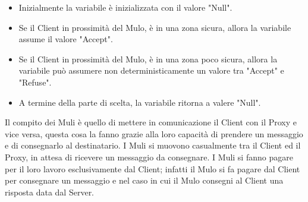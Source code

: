 \documentclass[13pt,a4paper]{article}
\begin{document}
\begin{itemize}
\begin{itemize}
	\begin{itemize}
		\item Inizialmente la variabile è inizializzata con il valore "Null".
		\item Se il Client in prossimità del Mulo,  è in una zona sicura, allora la variabile assume il valore "Accept". 
		\item Se il Client in prossimità del Mulo, è in una zona poco sicura, allora la variabile può assumere non deterministicamente un valore tra "Accept" e "Refuse".
		\item A termine della parte di scelta, la variabile ritorna a valere "Null".
	\end{itemize}
	\end{itemize}
	Il compito dei Muli è  quello di mettere in comunicazione il Client con il Proxy e vice versa, questa cosa la fanno grazie alla loro capacità di prendere un messaggio e di consegnarlo al destinatario. I Muli si muovono casualmente tra il Client ed il Proxy, in attesa di ricevere un messaggio da consegnare. I Muli si fanno pagare per il loro lavoro esclusivamente dal Client; infatti il Mulo si fa pagare dal Client per consegnare un messaggio  e nel caso in cui il Mulo consegni al Client una risposta data dal Server.
	

\end{itemize}
\end{document}
